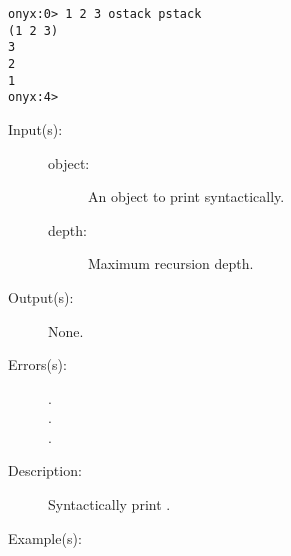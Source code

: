 \begin{description}
\begin{description}
\begin{verbatim}
onyx:0> 1 2 3 ostack pstack
(1 2 3)
3
2
1
onyx:4>
		\end{verbatim}
	\end{description}
\label{systemdict:output}
\item[{\onyxop{object depth}{output}{--}}: ]
	\begin{description}\item[]
	\item[Input(s): ]
		\begin{description}\item[]
		\item[object: ]
			An object to print syntactically.
		\item[depth: ]
			Maximum recursion depth.
		\end{description}
	\item[Output(s): ] None.
	\item[Errors(s): ]
		\begin{description}\item[]
		\item[.]
		\item[.]
		\item[.]
		\end{description}
	\item[Description: ]
		Syntactically print .
	\item[Example(s): ]\begin{verbatim}


\end{verbatim}
\end{description}
\end{description}
